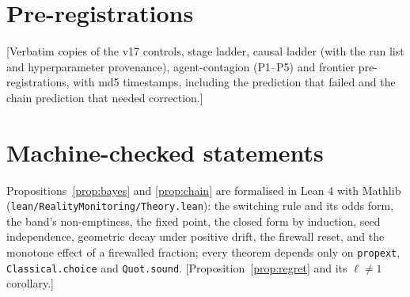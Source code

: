 \documentclass{article}
\newcommand{\pending}[1]{\textcolor{blue!70!black}{[#1]}}
\begin{document}



\appendix
\section{Pre-registrations}\label{app:prereg}
\pending{Verbatim copies of the v17 controls, stage ladder, causal ladder (with the run list and hyperparameter provenance), agent-contagion (P1--P5) and frontier pre-registrations, with md5 timestamps, including the prediction that failed and the chain prediction that needed correction.}
\section{Machine-checked statements}\label{app:lean}
Propositions~\ref{prop:bayes} and \ref{prop:chain} are formalised in Lean 4 with Mathlib (\texttt{lean/RealityMonitoring/Theory.lean}): the switching rule and its odds form, the band's non-emptiness, the fixed point, the closed form by induction, seed independence, geometric decay under positive drift, the firewall reset, and the monotone effect of a firewalled fraction; every theorem depends only on \texttt{propext}, \texttt{Classical.choice} and \texttt{Quot.sound}. \pending{Proposition~\ref{prop:regret} and its $\ell\neq1$ corollary.}
\end{document}

